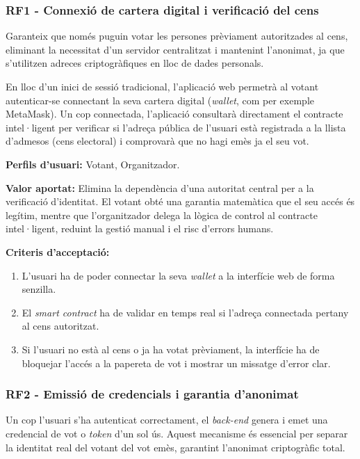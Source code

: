 \documentclass[12pt,a4paper,catalan]{article}
\begin{document}
\subsubsection*{RF1 - Connexió de cartera digital i verificació del cens}

Garanteix que només puguin votar les persones prèviament autoritzades al cens, eliminant la necessitat d'un servidor centralitzat i mantenint l'anonimat, ja que s'utilitzen adreces criptogràfiques en lloc de dades personals.

En lloc d'un inici de sessió tradicional, l'aplicació web permetrà al votant autenticar-se connectant la seva cartera digital (\textit{wallet}, com per exemple MetaMask). Un cop connectada, l'aplicació consultarà directament el contracte intel·ligent per verificar si l'adreça pública de l'usuari està registrada a la llista d'admesos (cens electoral) i comprovarà que no hagi emès ja el seu vot.

\textbf{Perfils d'usuari:} Votant, Organitzador.

\textbf{Valor aportat:} Elimina la dependència d'una autoritat central per a la verificació d'identitat. El votant obté una garantia matemàtica que el seu accés és legítim, mentre que l'organitzador delega la lògica de control al contracte intel·ligent, reduint la gestió manual i el risc d'errors humans.

\textbf{Criteris d'acceptació:}
\begin{enumerate}[label=\roman*.]
    \item L'usuari ha de poder connectar la seva \textit{wallet} a la interfície web de forma senzilla.
    \item El \textit{smart contract} ha de validar en temps real si l'adreça connectada pertany al cens autoritzat.
    \item Si l'usuari no està al cens o ja ha votat prèviament, la interfície ha de bloquejar l'accés a la papereta de vot i mostrar un missatge d'error clar.
\end{enumerate}

\subsubsection*{RF2 - Emissió de credencials i garantia d'anonimat}

Un cop l'usuari s'ha autenticat correctament, el \textit{back-end} genera i emet una credencial de vot o \textit{token} d'un sol ús. Aquest mecanisme és essencial per separar la identitat real del votant del vot emès, garantint l'anonimat criptogràfic total.
\end{document}
